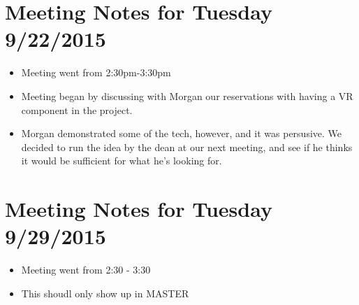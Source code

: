 \documentclass[]{article}
\begin{document}
\section{Meeting Notes for Tuesday 9/22/2015}
	\begin{itemize}
		\item Meeting went from 2:30pm-3:30pm
	\end{itemize}
	\begin{itemize}
		\item Meeting began by discussing with Morgan our reservations with having a VR component in the project. 
		\item Morgan demonstrated some of the tech, however, and it was persusive. We decided to run the idea by 
		the dean at our next meeting, and see if he thinks it would be sufficient for what he's looking for. 
	\end{itemize}
	
\section{Meeting Notes for Tuesday 9/29/2015}
	\begin{itemize}
		\item Meeting went  from 2:30 - 3:30
		\item This shoudl only show up in MASTER	\end{itemize}
		
\end{document}

